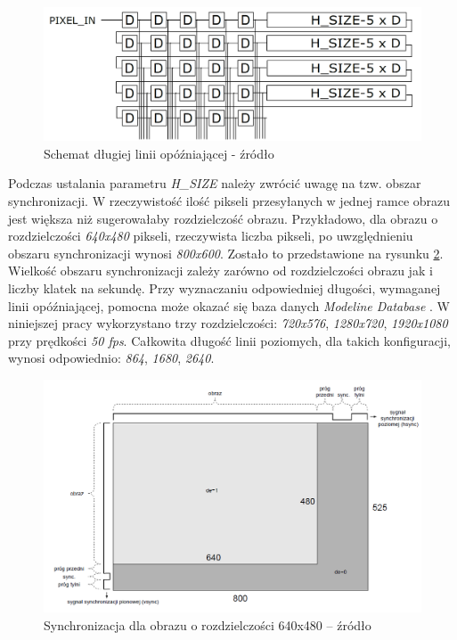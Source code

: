 	\begin{figure}[h!]
	    \centering
		\includegraphics[scale=0.2]{img/4/context.png}
		\caption{Schemat długiej linii opóźniającej - źródło \cite{komorkiewicz_14}}
		\label{fig:fpga_delay_line}
	\end{figure}
	
Podczas ustalania parametru \textit{H\_SIZE} należy zwrócić uwagę na tzw. obszar synchronizacji. W rzeczywistość ilość pikseli przesyłanych w jednej ramce obrazu jest większa niż sugerowałaby rozdzielczość obrazu. Przykładowo, dla obrazu o rozdzielczości \textit{640x480} pikseli, rzeczywista liczba pikseli, po uwzględnieniu obszaru synchronizacji wynosi \textit{800x600}. Zostało to przedstawione na rysunku \ref{fig:fpga_sync_signals}. Wielkość obszaru synchronizacji zależy zarówno od rozdzielczości obrazu jak i liczby klatek na sekundę. Przy wyznaczaniu odpowiedniej długości, wymaganej linii opóźniającej, pomocna może okazać się baza danych \textit{Modeline Database} \cite{modeline_db_web}. W niniejszej pracy wykorzystano trzy rozdzielczości: \textit{720x576}, \textit{1280x720}, \textit{1920x1080} przy prędkości \textit{50 fps}. Całkowita długość linii poziomych, dla takich konfiguracji, wynosi odpowiednio: \textit{864}, \textit{1680}, \textit{2640}.

	\begin{figure}[h!]
        \centering
		\includegraphics[scale=0.55]{img/4/sync_signals.png}
		\caption{Synchronizacja dla obrazu o rozdzielczości 640x480 -- źródło \cite{komorkiewicz_14}}
		\label{fig:fpga_sync_signals}
	\end{figure}


